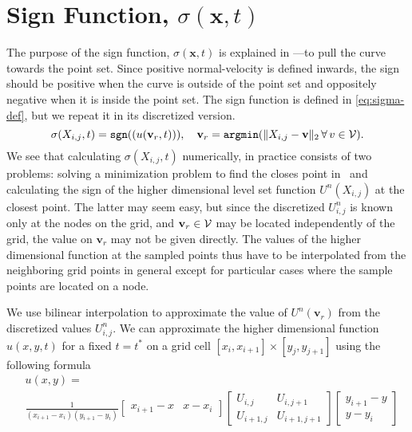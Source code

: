 \section{Sign Function, \texorpdfstring{$\sigma (\mathbf{x}, t)$}{sigma}} \label{sec:signfunction}
The purpose of the sign function, $\sigma(\mathbf{x}, t)$ is explained in ---to pull the curve towards the point set. Since positive normal-velocity is defined inwards, the sign should be positive when the curve is outside of the point set and oppositely negative when it is inside the point set. The sign function is defined in \eqref{eq:sigma-def}, but we repeat it in its discretized version.
\begin{equation}
    \sigma(X_{i, j}, t) = \texttt{sgn}((u(\mathbf{v}_r, t))), \quad \mathbf{v}_r = \texttt{argmin}(\|X_{i, j}- \mathbf{v}\|_2\, \forall \, v\in \mathcal{V}). 
    \label{eq:sigma-function}
\end{equation}
We see that calculating $\sigma(X_{i, j}, t)$ numerically, in practice consists of two problems: solving a minimization problem to find the closes point in \pointset\ and calculating the sign of the higher dimensional level set function $U^n(X_{i, j})$ at the closest point. The latter may seem easy, but since the discretized $U_{i, j}^n$ is known only at the nodes on the grid, and $\mathbf{v}_r \in \mathcal{V}$ may be located independently of the grid, the value on $\mathbf{v}_r$ may not be given directly. The values of the higher dimensional function at the sampled points thus have to be interpolated from the neighboring grid points in general except for particular cases where the sample points are located on a node.

We use bilinear interpolation to approximate the value of $U^n(\mathbf{v}_r)$ from the discretized values $U_{i, j}^n$. We can approximate the higher dimensional function $u(x, y, t)$ for a fixed $t=t^*$ on a grid cell $[x_i, x_{i+1}]\times [y_j, y_{j+1}]$ using the following formula \cite{Press2007Numerical}
\begin{equation}
\begin{split}
    &u(x, y) = \\
    &\frac{1}{(x_{i+1}-x_i)(y_{i+1}- y_i)} \begin{bmatrix} x_{i+1}- x & x - x_i \end{bmatrix} \begin{bmatrix} U_{i, j} & U_{i, j+1} \\ U_{i+1, j} & U_{i+1, j+1} \end{bmatrix} \begin{bmatrix} y_{i+1}-y \\ y-y_i \end{bmatrix}
\end{split}
\label{eq:bilinear-interpolation}
\end{equation}

